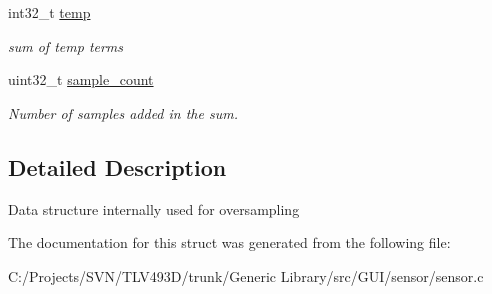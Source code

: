 \begin{DoxyCompactItemize}
int32\+\_\+t \mbox{\hyperlink{struct_t_lx493_d__data__oversample__frame__t_a40effa7ffb501cdee7a69a7801f105a3}{temp}}
\begin{DoxyCompactList}\small\item\em sum of temp terms \end{DoxyCompactList}\item 
\mbox{\label{struct_t_lx493_d__data__oversample__frame__t_a1b7979d8ce8c0f077127019f99ac8ea6}} 
uint32\+\_\+t \mbox{\hyperlink{struct_t_lx493_d__data__oversample__frame__t_a1b7979d8ce8c0f077127019f99ac8ea6}{sample\+\_\+count}}
\begin{DoxyCompactList}\small\item\em Number of samples added in the sum. \end{DoxyCompactList}\end{DoxyCompactItemize}


\subsection{Detailed Description}
Data structure internally used for oversampling 

The documentation for this struct was generated from the following file\+:\begin{DoxyCompactItemize}
\item 
C\+:/\+Projects/\+S\+V\+N/\+T\+L\+V493\+D/trunk/\+Generic Library/src/\+G\+U\+I/sensor/sensor.\+c\end{DoxyCompactItemize}
